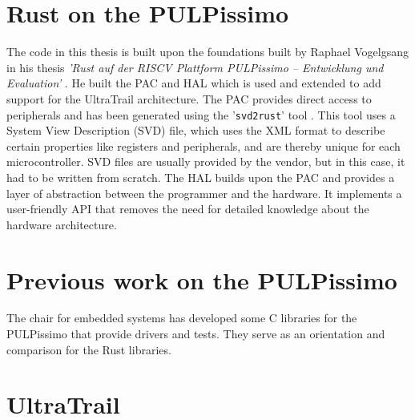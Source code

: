 
\section{Rust on the PULPissimo}

The code in this thesis is built upon the foundations built by Raphael Vogelgsang in his thesis \emph{'Rust auf der RISCV Plattform PULPissimo – Entwicklung und
Evaluation'} \cite{rust_pulp}.
He built the PAC and HAL which is used and extended to add support for the UltraTrail architecture.
The PAC provides direct access to peripherals and has been generated using the '\lstinline{svd2rust}' tool \cite{svd2rust}.
This tool uses a System View Description (SVD) file, which uses the XML format to describe certain properties like registers and peripherals, and are
thereby unique for each microcontroller.
SVD files are usually provided by the vendor, but in this case, it had to be written from scratch.
The HAL builds upon the PAC and provides a layer of abstraction between the programmer and the hardware.
It implements a user-friendly API that removes the need for detailed knowledge about the hardware architecture.

\section{Previous work on the PULPissimo}

The chair for embedded systems has developed some C libraries for the PULPissimo that provide drivers and tests.
They serve as an orientation and comparison for the Rust libraries.

\section{UltraTrail}

